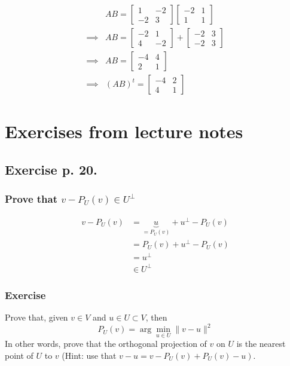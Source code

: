 \documentclass{article}
\begin{document}
\begin{align*}
    & AB =
    \begin{bmatrix}
        1  & -2 \\
        -2 & 3
    \end{bmatrix}
    \begin{bmatrix}
        -2 & 1 \\
        1  & 1
    \end{bmatrix} \\
    \implies & AB =
    \begin{bmatrix}
        -2 & 1 \\
        4 & -2
    \end{bmatrix} +
    \begin{bmatrix}
        -2 & 3 \\
        -2 & 3 
    \end{bmatrix} \\
    \implies &
    AB =
    \begin{bmatrix}
        -4 & 4 \\
        2 & 1
    \end{bmatrix} \\
    \implies &
    (AB)^t =
    \begin{bmatrix}
        -4 & 2 \\
        4 & 1
    \end{bmatrix}
\end{align*}

\section{Exercises from lecture notes}
\subsection{Exercise p. 20.}
\subsubsection{Prove that \(v - P_{U}(v) \in U^{\perp}\)}

\begin{align*}
    v - P_U (v)
    &= \underbrace{u}_{=P_U (v)} + u^{\perp} - P_U(v) \\
    &= P_U (v) + u^{\perp} - P_U(v) \\
    &= u^{\perp} \\
    &\in U^\perp
\end{align*}

\subsubsection{Exercise}
Prove that, given $v \in V$ and $u \in U \subset V$, then
\[
P_{U}(v)=\arg \min _{u \in U}\|v-u\|^{2}
\]
In other words, prove that the orthogonal projection of $v$ on $U$ is the nearest point of $U$ to $v$ (Hint: use that $\left.v-u=v-P_{U}(v)+P_{U}(v)-u\right)$.
\end{document}
